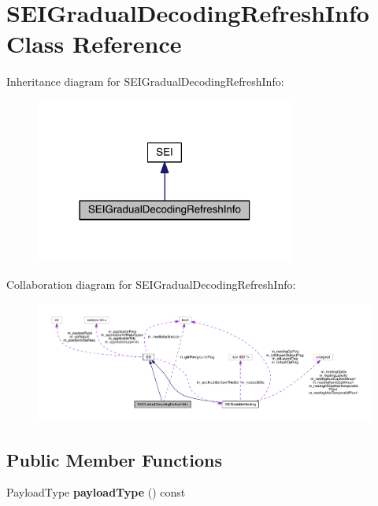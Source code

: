 \hypertarget{class_s_e_i_gradual_decoding_refresh_info}{}\section{S\+E\+I\+Gradual\+Decoding\+Refresh\+Info Class Reference}
\label{class_s_e_i_gradual_decoding_refresh_info}


Inheritance diagram for S\+E\+I\+Gradual\+Decoding\+Refresh\+Info\+:
\nopagebreak
\begin{figure}[H]
\begin{center}
\leavevmode
\includegraphics[width=242pt]{d0/d56/class_s_e_i_gradual_decoding_refresh_info__inherit__graph}
\end{center}
\end{figure}


Collaboration diagram for S\+E\+I\+Gradual\+Decoding\+Refresh\+Info\+:
\nopagebreak
\begin{figure}[H]
\begin{center}
\leavevmode
\includegraphics[width=350pt]{db/d44/class_s_e_i_gradual_decoding_refresh_info__coll__graph}
\end{center}
\end{figure}
\subsection*{Public Member Functions}
\begin{DoxyCompactItemize}
\item 
\mbox{\label{class_s_e_i_gradual_decoding_refresh_info_a379f5c75ec3ba9fecc85c45851776f7e}} 
Payload\+Type {\bfseries payload\+Type} () const
\end{DoxyCompactItemize}
